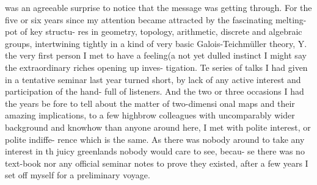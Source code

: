 was an agreeable surprise to notice that the message  was getting through.
 For the five or six years since my
attention became attracted by the fascinating melting-pot of key structu-%
res  in geometry, topology, arithmetic,
discrete and algebraic groups, intertwining tightly in a kind of
very basic Galois-Teichmüller theory, Y.  the very first
 person I met  to have a feeling(a not yet dulled instinct I might
say\xout{,}  the extraordinary riches\hand{,} opening up  inves-%
tigation. Te series of talks I had given  in a tentative seminar last year
 turned short, by lack of any active interest and participation of  the hand-%
full of  listeners. And the two or three occasions I had  the years be\hand{-}
fore to tell about the matter of  two-dimensi
onal maps and their amazing  implications,  to a few
highbrow colleagues with uncomparably wider background and knowhow than
anyone around here, I met  with polite interest,  or polite indiffe-%
rence which is the same.  As there was nobody around  to take any
interest in th juicy greenlands nobody would care to see,  becau-%
se there was no text-book nor any official seminar notes to prove they
existed,  after a few years I  set off myself for a preliminary voyage.

